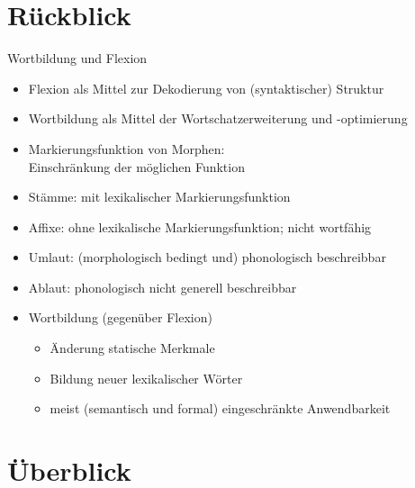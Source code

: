
\section{Rückblick}

\begin{frame}
  {Wortbildung und Flexion}
  \pause
  \begin{itemize}[<+->]
    \item Flexion als Mittel zur Dekodierung von (syntaktischer) Struktur
    \item Wortbildung als Mittel der Wortschatzerweiterung und -optimierung
      \Halbzeile
    \item Markierungsfunktion von Morphen:\\
      \alert{Einschränkung} der möglichen Funktion
    \item Stämme: mit lexikalischer Markierungsfunktion
    \item Affixe: ohne lexikalische Markierungsfunktion; nicht wortfähig
      \Halbzeile
    \item Umlaut: (morphologisch bedingt und) phonologisch beschreibbar
    \item Ablaut: phonologisch nicht generell beschreibbar
      \Halbzeile
    \item Wortbildung (gegenüber Flexion)
      \begin{itemize}
        \item Änderung statische Merkmale
        \item Bildung neuer lexikalischer Wörter
        \item meist (semantisch und formal) eingeschränkte Anwendbarkeit
      \end{itemize} 
  \end{itemize}
\end{frame}

\section{Überblick}

